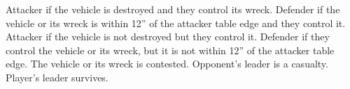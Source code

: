 \begin{columns}

\scoringbox%
{Attacker if the vehicle is destroyed and they control its wreck.
  Defender if the vehicle or its wreck is within 12'' of the attacker
  table edge and they control it.}%
{Attacker if the vehicle is not destroyed but they control it.
  Defender if they control the vehicle or its wreck, but it is not
  within 12'' of the attacker table edge.}%
{The vehicle or its wreck is contested.}%
{Opponent's leader is a casualty.}%
{Player's leader survives.}

\end{columns}

